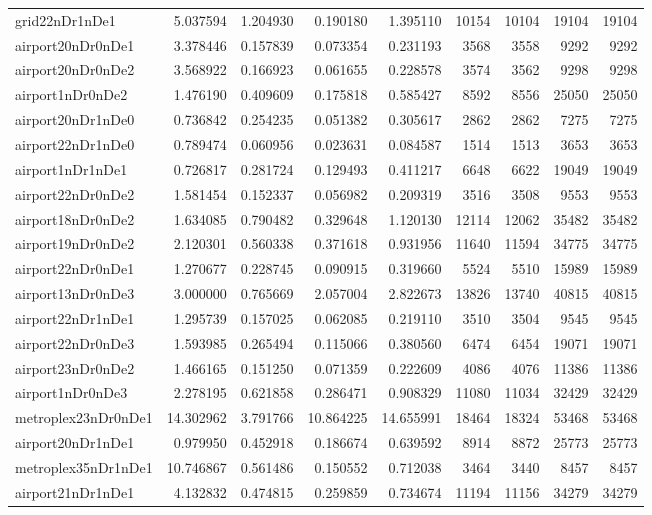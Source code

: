 \begin{longtable}{|l|r|r|r|r|r|r|r|r|}
grid22nDr1nDe1 & 5.037594 & 1.204930 & 0.190180 & 1.395110 & 10154 & 10104 & 19104 & 19104 \\
airport20nDr0nDe1 & 3.378446 & 0.157839 & 0.073354 & 0.231193 & 3568 & 3558 & 9292 & 9292 \\
airport20nDr0nDe2 & 3.568922 & 0.166923 & 0.061655 & 0.228578 & 3574 & 3562 & 9298 & 9298 \\
airport1nDr0nDe2 & 1.476190 & 0.409609 & 0.175818 & 0.585427 & 8592 & 8556 & 25050 & 25050 \\
airport20nDr1nDe0 & 0.736842 & 0.254235 & 0.051382 & 0.305617 & 2862 & 2862 & 7275 & 7275 \\
airport22nDr1nDe0 & 0.789474 & 0.060956 & 0.023631 & 0.084587 & 1514 & 1513 & 3653 & 3653 \\
airport1nDr1nDe1 & 0.726817 & 0.281724 & 0.129493 & 0.411217 & 6648 & 6622 & 19049 & 19049 \\
airport22nDr0nDe2 & 1.581454 & 0.152337 & 0.056982 & 0.209319 & 3516 & 3508 & 9553 & 9553 \\
airport18nDr0nDe2 & 1.634085 & 0.790482 & 0.329648 & 1.120130 & 12114 & 12062 & 35482 & 35482 \\
airport19nDr0nDe2 & 2.120301 & 0.560338 & 0.371618 & 0.931956 & 11640 & 11594 & 34775 & 34775 \\
airport22nDr0nDe1 & 1.270677 & 0.228745 & 0.090915 & 0.319660 & 5524 & 5510 & 15989 & 15989 \\
airport13nDr0nDe3 & 3.000000 & 0.765669 & 2.057004 & 2.822673 & 13826 & 13740 & 40815 & 40815 \\
airport22nDr1nDe1 & 1.295739 & 0.157025 & 0.062085 & 0.219110 & 3510 & 3504 & 9545 & 9545 \\
airport22nDr0nDe3 & 1.593985 & 0.265494 & 0.115066 & 0.380560 & 6474 & 6454 & 19071 & 19071 \\
airport23nDr0nDe2 & 1.466165 & 0.151250 & 0.071359 & 0.222609 & 4086 & 4076 & 11386 & 11386 \\
airport1nDr0nDe3 & 2.278195 & 0.621858 & 0.286471 & 0.908329 & 11080 & 11034 & 32429 & 32429 \\
metroplex23nDr0nDe1 & 14.302962 & 3.791766 & 10.864225 & 14.655991 & 18464 & 18324 & 53468 & 53468 \\
airport20nDr1nDe1 & 0.979950 & 0.452918 & 0.186674 & 0.639592 & 8914 & 8872 & 25773 & 25773 \\
metroplex35nDr1nDe1 & 10.746867 & 0.561486 & 0.150552 & 0.712038 & 3464 & 3440 & 8457 & 8457 \\
airport21nDr1nDe1 & 4.132832 & 0.474815 & 0.259859 & 0.734674 & 11194 & 11156 & 34279 & 34279 \\

\end{longtable}
